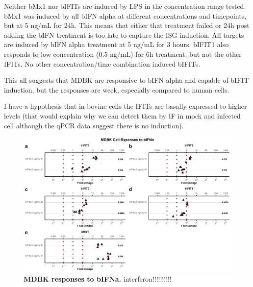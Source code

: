 Neither bMx1 nor bIFITs are induced by LPS in the concentration range tested. bMx1 was induced by all bIFN alpha at different concentrations and timepoints, but at 5 ng/mL for 24h. This means that either that treatment failed or 24h post adding the bIFN treatment is too late to capture the ISG induction. All targets are induced by bIFN alpha treatment at 5 ng/mL for 3 hours. bIFIT1 also responds to low concentration (0.5 ng/mL) for 6h treatment, but not the other IFITs. No other concentration/time combination induced bIFITs. 

This all suggests that MDBK are responsive to bIFN alpha and capable of bIFIT induction, but the responses are week, especially compared to human cells.

I have a hypothesis that in bovine cells the IFITs are basally expressed to higher levels  (that would explain why we can detect them by IF in mock and infected cell although the qPCR data suggest there is no induction).

\begin{figure}
    \centering
    \includegraphics[width=1\linewidth]{07. Chapter 2/Figs/02. Induction/01. mdbk_treat_bifna.pdf}
    \caption[MDBK responses to bIFNa.]{\textbf{MDBK responses to bIFNa.} interferon!!!!!!!!!!}
    \label{MDBK responses to bIFNa}
\end{figure}

